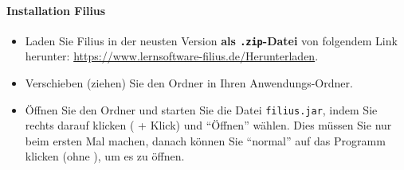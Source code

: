\paragraph*{Installation Filius}

\begin{itemize}
	\item Laden Sie Filius in der neusten Version \textbf{als \texttt{.zip}-Datei} von folgendem Link herunter: \url{https://www.lernsoftware-filius.de/Herunterladen}.
	\item Verschieben (ziehen) Sie den Ordner in Ihren Anwendungs-Ordner.
	\item Öffnen Sie den Ordner und starten Sie die Datei \texttt{filius.jar}, indem Sie rechts darauf klicken (\keys{\Alt} + Klick) und ``Öffnen'' wählen. Dies müssen Sie nur beim ersten Mal machen, danach können Sie ``normal'' auf das Programm klicken (ohne \keys{\Alt}), um es zu öffnen.
\end{itemize}


\newpage
\printglossary
